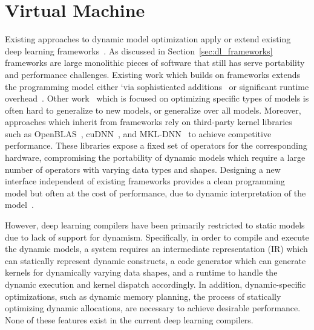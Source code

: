 \section{Virtual Machine}
\label{sec:vm}

Existing approaches to dynamic model optimization apply or extend existing
  deep learning frameworks~\citep{xu2018cavs, gao2018low, yu2018dynamic, jeong2018improving, jeong2019janus, dynet, tf_fold}.
As discussed in Section~\ref{sec:dl_frameworks} frameworks are large monolithic pieces
  of software that still has serve portability and performance challenges.
Existing work which builds on frameworks extends the programming model either
`via sophisticated additions~\citep{yu2018dynamic} or significant runtime overhead~\citep{tf_fold, jeong2019janus}.
Other work~\citep{xu2018cavs, gao2018low, tf_fold} which is focused on optimizing specific types of models
  is often hard to generalize to new models, or generalize over all models.
Moreover, approaches which inherit from frameworks rely on third-party kernel libraries such as
  OpenBLAS~\citep{xianyi2014openblas}, cuDNN~\citep{cudnn}, and MKL-DNN~\citep{mkldnn} to achieve competitive performance.
These libraries expose a fixed set of operators for the corresponding hardware, compromising the portability of dynamic models
  which require a large number of operators with varying data types and shapes. Designing a new interface independent of existing frameworks
  provides a clean programming model but often at the cost of performance, due to dynamic interpretation of the model~\citep{dynet}.

However, deep learning compilers have been primarily restricted
  to static models due to lack of support for dynamism.
Specifically, in order to compile and execute the dynamic models,
  a system requires an intermediate representation (IR) which can statically represent dynamic constructs,
  a code generator which can generate kernels for dynamically varying data shapes,
  and a runtime to handle the dynamic execution and kernel dispatch accordingly.
In addition, dynamic-specific optimizations, such as dynamic memory planning, the process of statically optimizing dynamic allocations,
  are necessary to achieve desirable performance.
None of these features exist in the current deep learning compilers.

